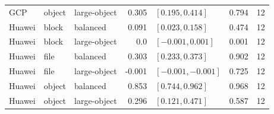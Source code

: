 \begin{tabular}{lllrlrr}
GCP & object & large-object & 0.305 & $[0.195, 0.414]$ & 0.794 & 12 \\
Huawei & block & balanced & 0.091 & $[0.023, 0.158]$ & 0.474 & 12 \\
Huawei & block & large-object & 0.0 & $[-0.001, 0.001]$ & 0.001 & 12 \\
Huawei & file & balanced & 0.303 & $[0.233, 0.373]$ & 0.902 & 12 \\
Huawei & file & large-object & -0.001 & $[-0.001, -0.001]$ & 0.725 & 12 \\
Huawei & object & balanced & 0.853 & $[0.744, 0.962]$ & 0.968 & 12 \\
Huawei & object & large-object & 0.296 & $[0.121, 0.471]$ & 0.587 & 12 \\
\bottomrule
\end{tabular}
